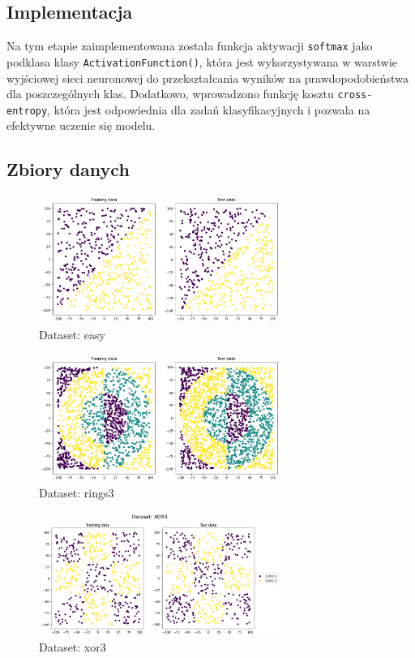 \documentclass{article}
\begin{document}
\subsection*{Implementacja}
Na tym etapie zaimplementowana została funkcja aktywacji \texttt{softmax} jako podklasa klasy \texttt{ActivationFunction()}, która jest wykorzystywana w warstwie wyjściowej sieci neuronowej do przekształcania wyników na prawdopodobieństwa dla poszczególnych klas. Dodatkowo, wprowadzono funkcję kosztu \texttt{cross-entropy}, która jest odpowiednia dla zadań klasyfikacyjnych i pozwala na efektywne uczenie się modelu.
\newpage

\subsection*{Zbiory danych}
\begin{figure}[H]
    \centering
    \includegraphics[width=0.7\textwidth]{img/nn4/easy.png}
    \caption{Dataset: easy}
\end{figure}
\begin{figure}[H]
    \centering
    \includegraphics[width=0.7\textwidth]{img/nn4/rings3.png}
    \caption{Dataset: rings3}
\end{figure}
\begin{figure}[H]
    \centering
    \includegraphics[width=0.7\textwidth]{img/nn4/xor3.png}
    \caption{Dataset: xor3}
\end{figure}
\newpage
\end{document}
